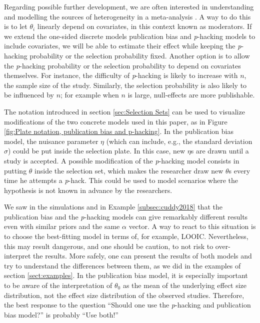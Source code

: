 \documentclass{article}
\theoremstyle{plain}
\theoremstyle{definition}
\begin{document}
Regarding possible further development, we are often interested in understanding and modelling the sources of heterogeneity in a meta-analysis \citep{thompson1994systematic}. A way to do this is to let $\theta_{i}$ linearly depend on covariates, in this context known as moderators. If we extend the one-sided discrete models publication bias and \textit{p}-hacking models to include covariates, we will be able to estimate their effect while keeping the \textit{p}-hacking probability or the selection probability fixed. Another option is to allow the \textit{p}-hacking probability or the selection probability to depend on covariates themselves. For instance, the difficulty of \textit{p}-hacking is likely to increase with $n$, the sample size of the study. Similarly, the selection probability is also likely to be influenced by $n$; for example when $n$ is large, null-effects are more publishable.

The notation introduced in section \ref{sec:Selection Sets} can be used to visualize modifications of the two concrete models used in this paper, as in Figure \ref{fig:Plate notation, publication bias and p-hacking}. In the publication bias model, the nuisance parameter $\eta$ (which can include, e.g., the standard deviation $\sigma$) could be put inside the selection plate. In this case, new $\eta$s are drawn until a study is accepted. A possible modification of the \textit{p}-hacking model consists in putting $\theta$ inside the selection set, which makes the researcher draw new $\theta$s every time he attempts a \textit{p}-hack. This could be used to model scenarios where the hypothesis is not
known in advance by the researchers.

We saw in the simulations and in Example \ref{subsec:cuddy2018} that the publication bias and the \textit{p}-hacking models can give remarkably different results even with similar priors and the same $\alpha$ vector. A way to react to this situation is to choose the best-fitting model in terms of, for example, LOOIC. Nevertheless, this may result dangerous, and one should be caution, to not risk to over-interpret the results. More safely, one can present the results of both models and try to understand the differences between them, as we did in the examples of section \ref{sect:examples}. In the publication bias model, it is especially important to be aware of the interpretation of $\theta_{0}$ as the mean of the underlying effect size distribution, not the effect size distribution of the observed studies. Therefore, the best response to the question \enquote{Should one use the \textit{p}-hacking and publication bias model?} is probably \enquote{Use both!}
\end{document}
